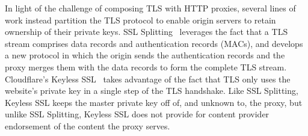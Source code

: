 % 



%
In light of the challenge of composing  TLS with HTTP proxies, several lines of
work instead partition the TLS protocol to enable origin servers to retain
ownership of their private keys.
%
SSL Splitting~\cite{ssl-splitting} leverages the fact that a TLS stream
comprises data records and authentication records (MACs), and develops a new
protocol in which the origin sends the authentication records and the proxy
merges them with the data records to form the complete TLS stream. 
%
Cloudflare’s Keyless SSL~\cite{keyless-ssl} takes advantage of the fact that
TLS only uses the website’s private key in a single step of the TLS handshake.
%
Like SSL Splitting, Keyless SSL keeps the master private key off of, and
unknown to, the proxy, but unlike SSL Splitting, Keyless SSL does not provide
for content provider endorsement of the content the proxy serves.



%



